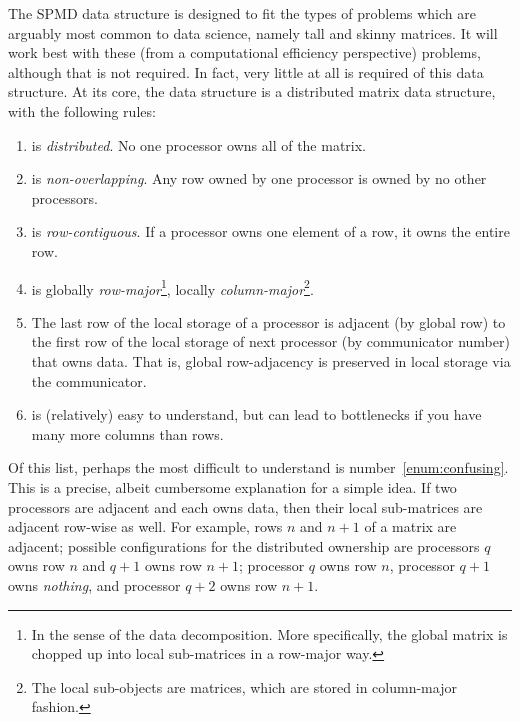 The SPMD data structure is designed to fit the types of problems which are arguably most common to data science, namely tall and skinny matrices.  It will work best with these (from a computational efficiency perspective) problems, although that is not required.  In fact, very little at all is required of this data structure.  At its core, the data structure is a distributed matrix data structure, with the following rules:
  \begin{enumerate}
    \item {} is \emph{distributed}.  No one processor owns all of the matrix.
    \item {} is \emph{non-overlapping}. Any row owned by one processor is owned by no other processors.
    \item {} is \emph{row-contiguous}.  If a processor owns one element of a row, it owns the entire row.
    \item {} is globally \emph{row-major}\footnote{In the sense of the data decomposition.  More specifically, the global matrix is chopped up into local sub-matrices in a row-major way.}, locally \emph{column-major}\footnote{The local sub-objects are  matrices, which are stored in column-major fashion.}.
    \item The last row of the local storage of a processor is adjacent (by global row) to the first row of the local storage of next processor (by communicator number) that owns data.  That is, global row-adjacency is preserved in local storage via the communicator.\label{enum:confusing}
    \item {} is (relatively) easy to understand, but can lead to bottlenecks if you have many more columns than rows.
  \end{enumerate}

Of this list, perhaps the most difficult to understand is number~\ref{enum:confusing}.  This is a precise, albeit cumbersome explanation for a simple idea.  If two processors are adjacent and each owns data, then their local sub-matrices are adjacent row-wise as well.  For example, rows $n$ and $n+1$ of a matrix are adjacent; possible configurations for the distributed ownership are processors $q$ owns row $n$ and $q+1$ owns row $n+1$; processor $q$ owns row $n$, processor $q+1$ owns \emph{nothing}, and processor $q+2$ owns row $n+1$.

